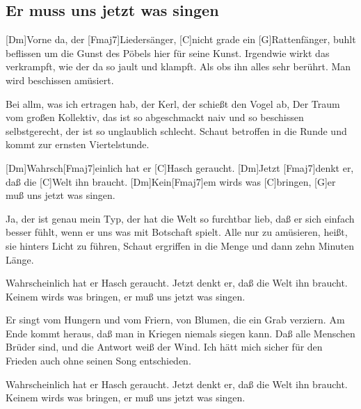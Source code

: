 \subsection*{Er muss uns jetzt was singen   }
\begin{guitar}

[Dm]Vorne da, der [Fmaj7]Liedersänger, 
[C]nicht grade ein [G]Rattenfänger, 
buhlt beflissen um die Gunst 
des Pöbels hier für seine Kunst. 
Irgendwie wirkt das verkrampft, 
wie der da so jault und klampft. 
Als obs ihn alles sehr berührt. 
Man wird beschissen amüsiert. 

Bei allm, was ich ertragen hab, 
der Kerl, der schießt den Vogel ab, 
Der Traum vom großen Kollektiv, 
das ist so abgeschmackt naiv 
und so beschissen selbstgerecht, 
der ist so unglaublich schlecht. 
Schaut betroffen in die Runde 
und kommt zur ernsten Viertelstunde. 


[Dm]Wahrsch[Fmaj7]einlich hat er [C]Hasch geraucht. 
[Dm]Jetzt [Fmaj7]denkt er, daß die [C]Welt ihn braucht. 
[Dm]Kein[Fmaj7]em wirds was [C]bringen, 
[G]er muß uns jetzt was singen. 


Ja, der ist genau mein Typ, 
der hat die Welt so furchtbar lieb, 
daß er sich einfach besser fühlt, 
wenn er uns was mit Botschaft spielt. 
Alle nur zu amüsieren, 
heißt, sie hinters Licht zu führen, 
Schaut ergriffen in die Menge 
und dann zehn Minuten Länge. 


Wahrscheinlich hat er Hasch geraucht. 
Jetzt denkt er, daß die Welt ihn braucht. 
Keinem wirds was bringen, 
er muß uns jetzt was singen. 


Er singt vom Hungern und vom Friern, 
von Blumen, die ein Grab verziern. 
Am Ende kommt heraus, daß man 
in Kriegen niemals siegen kann. 
Daß alle Menschen Brüder sind, 
und die Antwort weiß der Wind. 
Ich hätt mich sicher für den Frieden 
auch ohne seinen Song entschieden. 


Wahrscheinlich hat er Hasch geraucht. 
Jetzt denkt er, daß die Welt ihn braucht. 
Keinem wirds was bringen, 
er muß uns jetzt was singen. 
\end{guitar}
